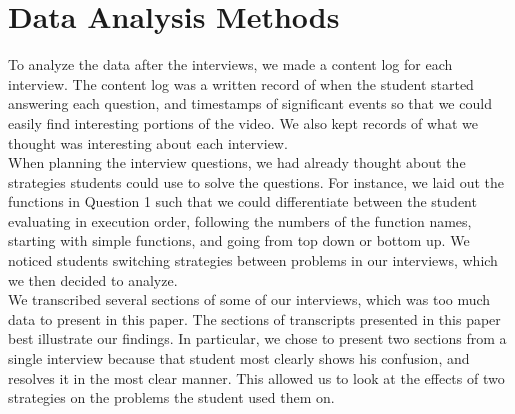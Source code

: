\section{Data Analysis Methods}

To analyze the data after the interviews, we made a content log for each interview.
The content log was a written record of when the student started answering each question,
 and timestamps of significant events so that we could easily find interesting portions of the video.
We also kept records of what we thought was interesting about each interview. \\

When planning the interview questions, we had already thought about the strategies students could use to solve the questions.
For instance, we laid out the functions in Question 1 such that we could differentiate between the student evaluating in execution order, following the numbers of the function names, starting with simple functions, and going from top down or bottom up.
We noticed students switching strategies between problems in our interviews, which we then decided to analyze. \\

We transcribed several sections of some of our interviews, which was too much data to present in this paper.
The sections of transcripts presented in this paper best illustrate our findings. 
In particular, we chose to present two sections from a single interview because that student most clearly shows his confusion, 
and resolves it in the most clear manner.
This allowed us to look at the effects of two strategies on the problems the student used them on.

\newpage
